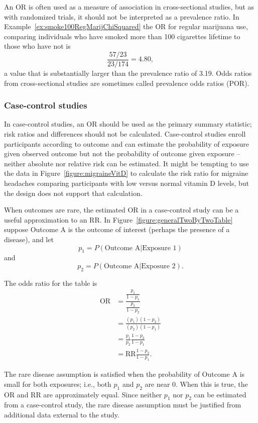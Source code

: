 An OR is often used as a measure of association in cross-sectional studies, but as with randomized trials, it should not be interpreted as a prevalence ratio.  In Example~\ref{ex:smoke100RegMarijChiSquared} the OR for regular marijuana use, comparing individuals who have smoked more than 100 cigarettes lifetime to those who have not is
\[
\frac{57/23}{23/174} = 4.80,
\]
a value that is substantially larger than the prevalence ratio of 3.19.  Odds ratios from cross-sectional studies are sometimes called prevalence odds ratios (POR).

\subsubsection{Case-control studies}

In case-control studies, an OR should be used as the primary summary statistic;  risk ratios and differences should not be calculated. Case-control studies enroll participants according to outcome and can estimate the probability of exposure given observed outcome but not the probability of outcome given exposure -- neither absolute nor relative risk can be estimated.  It might be tempting to use the data in Figure~\ref{figure:migraineVitD} to calculate the risk ratio for migraine headaches comparing participants with low versus normal vitamin D levels, but the design does not support that calculation.

When outcomes are rare, the estimated OR in a case-control study can be a useful approximation to an RR. In Figure~\ref{figure:generalTwoByTwoTable} suppose Outcome A is the outcome of interest (perhaps the presence of a disease), and let
\[
  p_1 = P(\text{Outcome A} | \text{Exposure 1})
\]
and
\[
  p_2 = P(\text{Outcome A} | \text{Exposure 2}).
\]

The odds ratio for the table is
\begin{align*}
  \text{OR} &= \dfrac{\frac{p_1}{1 - p_1}}{\frac{p_2}{1 - p_2}} \\
            &= \frac{(p_1)(1 - p_2)}{(p_2)(1 - p_1)} \\
            &= \frac{p_1}{p_2} \frac{1 - p_2}{1 - p_1} \\
            &= \text{RR} \frac{1 - p_2}{1 - p_1}.
\end{align*}

The rare disease assumption is satisfied when the probability of Outcome A is small for both exposures; i.e., both $p_1$ and $p_2$ are near 0. When this is true, the OR and RR are approximately equal. Since neither $p_1$ nor $p_2$ can be estimated from a case-control study, the rare disease assumption must be justified from additional data external to the study.

